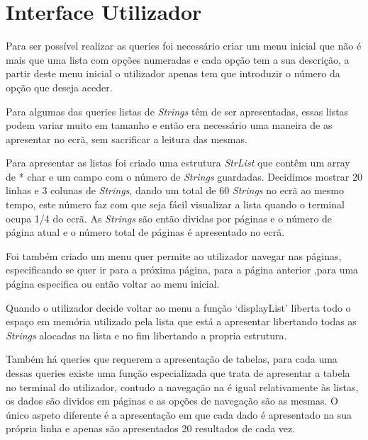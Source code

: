 \documentclass[10pt] {article}
\begin{document}
\section{Interface Utilizador}
\par Para ser possível realizar as queries foi necessário criar um menu inicial que não é mais que uma lista 
com opções numeradas e cada opção tem a sua descrição, a partir deste menu inicial o utilizador apenas 
tem que introduzir o número da opção que deseja aceder.
\par Para algumas das queries listas de \emph{Strings} têm de ser apresentadas, essas listas podem variar 
muito  em tamanho e então era necessário uma maneira de as apresentar no ecrã, sem sacrificar a leitura das 
mesmas. 
\par Para apresentar as listas foi criado uma estrutura \emph{StrList} que contêm um array de {* char} e um campo 
com o número de \emph{Strings} guardadas. Decidimos mostrar 20 linhas e 3 colunas de \emph{Strings}, 
dando um total de 60 \emph{Strings} no ecrã ao mesmo tempo, este número faz com que seja fácil visualizar a lista 
quando o terminal ocupa 1/4 do ecrã. As \emph{Strings} são então dividas por páginas e o número de página 
atual e o número total de páginas é apresentado no ecrã.
\par Foi também criado um menu quer permite ao utilizador navegar nas páginas, especificando se quer ir para a 
próxima página, para a página anterior ,para uma página especifica ou então voltar ao menu inicial.
\par Quando o utilizador decide voltar ao menu a função `displayList' liberta todo o espaço em memória utilizado 
pela lista que está a apresentar libertando todas as \emph{Strings} alocadas na lista e no fim libertando a propria 
estrutura.
\par Também há queries que requerem a apresentação de tabelas, para cada uma dessas queries existe uma 
função especializada que trata de apresentar a tabela no terminal do utilizador, contudo a navegação na é 
igual relativamente às listas, os dados são dividos em páginas e as opções de navegação são as mesmas. O único 
aspeto diferente é a apresentação em que cada dado é apresentado na sua própria linha e apenas são 
apresentados 20 resultados de cada vez.

\newpage
\end{document}
